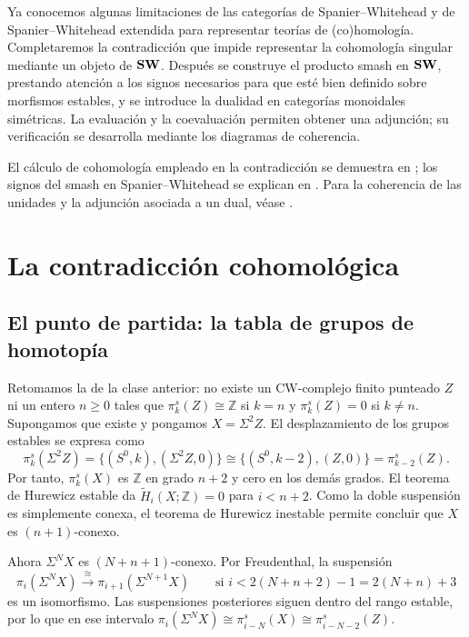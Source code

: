Ya conocemos algunas limitaciones de las categorías de Spanier--Whitehead y de Spanier--Whitehead extendida para representar teorías de (co)homología. Completaremos la contradicción que impide representar la cohomología singular mediante un objeto de $\mathbf{SW}$. Después se construye el producto smash en $\mathbf{SW}$, prestando atención a los signos necesarios para que esté bien definido sobre morfismos estables, y se introduce la dualidad en categorías monoidales simétricas. La evaluación y la coevaluación permiten obtener una adjunción; su verificación se desarrolla mediante los diagramas de coherencia.

El cálculo de cohomología empleado en la contradicción se demuestra en \cite[\S2, teorema~3, pp.~202--205]{serre1953}; los signos del smash en Spanier--Whitehead se explican en \cite[\S4.2.2]{malkiewich}. Para la coherencia de las unidades y la adjunción asociada a un dual, véase \cite[proposiciones~2.2.4 y 2.10.8]{egno2015}.

\section{La contradicción cohomológica}
\subsection{El punto de partida: la tabla de grupos de homotopía}

Retomamos la  de la clase anterior: no existe un CW-complejo finito punteado $Z$ ni un entero $n\ge0$ tales que $\pi_k^s(Z)\cong\mathbb Z$ si $k=n$ y $\pi_k^s(Z)=0$ si $k\ne n$. Supongamos que existe y pongamos $X=\Sigma^2Z$. El desplazamiento de los grupos estables se expresa como
\[
\pi_k^s(\Sigma^2Z)=\bigl\{(S^0,k),(\Sigma^2Z,0)\bigr\}
\cong\bigl\{(S^0,k-2),(Z,0)\bigr\}
=\pi_{k-2}^s(Z).
\]
Por tanto, $\pi_k^s(X)$ es $\mathbb Z$ en grado $n+2$ y cero en los demás grados. El teorema de Hurewicz estable da $\widetilde H_i(X;\mathbb Z)=0$ para $i<n+2$. Como la doble suspensión es simplemente conexa, el teorema de Hurewicz inestable permite concluir que $X$ es $(n+1)$-conexo.

Ahora $\Sigma^NX$ es $(N+n+1)$-conexo. Por Freudenthal, la suspensión
\[
\pi_i(\Sigma^NX)\xrightarrow{\ \cong\ }\pi_{i+1}(\Sigma^{N+1}X)
\qquad\text{si }i<2(N+n+2)-1=2(N+n)+3
\]
es un isomorfismo. Las suspensiones posteriores siguen dentro del rango estable, por lo que en ese intervalo $\pi_i(\Sigma^NX)\cong\pi_{i-N}^s(X)\cong\pi_{i-N-2}^s(Z)$.

